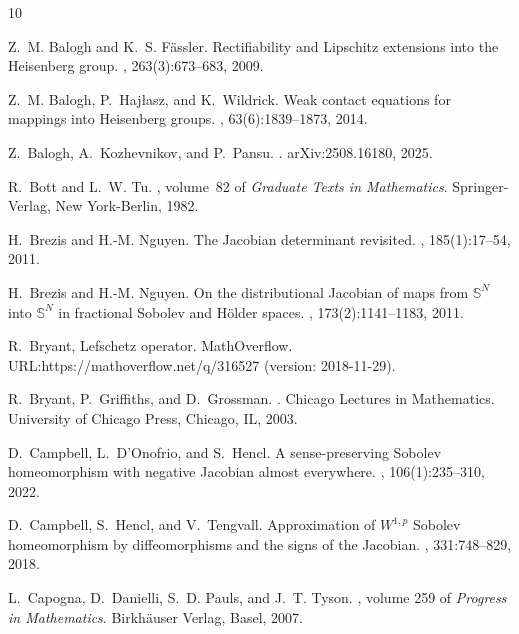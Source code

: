 \documentclass[intlimits,12pt,reqno]{amsart}
\numberwithin{equation}{section}
\theoremstyle{definition}
\begin{document}
\begin{thebibliography}{10}

Z.~M. Balogh and K.~S. F\"{a}ssler.
\newblock Rectifiability and {L}ipschitz extensions into the {H}eisenberg
  group.
, 263(3):673--683, 2009.

Z.~M. Balogh, P.~Haj\l{}asz, and K.~Wildrick.
\newblock Weak contact equations for mappings into {H}eisenberg groups.
, 63(6):1839--1873, 2014.

Z.~Balogh, A.~Kozhevnikov, and P.~Pansu.
.
\newblock arXiv:2508.16180, 2025.


R.~Bott and L.~W. Tu.
, volume~82 of {\em
  Graduate Texts in Mathematics}.
\newblock Springer-Verlag, New York-Berlin, 1982.

H.~Brezis and H.-M. Nguyen.
\newblock The {J}acobian determinant revisited.
, 185(1):17--54, 2011.

H.~Brezis and H.-M. Nguyen.
\newblock On the distributional {J}acobian of maps from {$\mathbb{S}^N$} into
  {$\mathbb{S}^N$} in fractional {S}obolev and {H}\"{o}lder spaces.
, 173(2):1141--1183, 2011.

R.~Bryant, 
\newblock Lefschetz operator.
\newblock MathOverflow.
\newblock URL:https://mathoverflow.net/q/316527 (version: 2018-11-29).


R.~Bryant, P.~Griffiths, and D.~Grossman.
.
\newblock Chicago Lectures in Mathematics. University of Chicago Press,
  Chicago, IL, 2003.


D.~Campbell, L.~D'Onofrio, and S.~Hencl.
\newblock A sense-preserving {S}obolev homeomorphism with negative {J}acobian
  almost everywhere.
, 106(1):235--310, 2022.

D.~Campbell, S.~Hencl, and V.~Tengvall.
\newblock Approximation of {$W^{1,p}$} {S}obolev homeomorphism by
  diffeomorphisms and the signs of the {J}acobian.
, 331:748--829, 2018.

L.~Capogna, D.~Danielli, S.~D. Pauls, and J.~T. Tyson.
, volume 259 of {\em Progress in
  Mathematics}.
\newblock Birkh\"{a}user Verlag, Basel, 2007.




\end{thebibliography}
\end{document}
